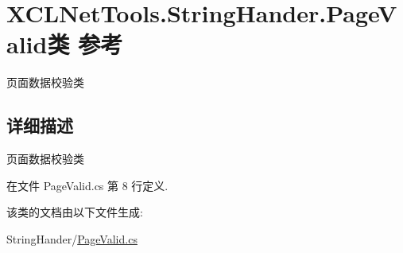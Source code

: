 \hypertarget{class_x_c_l_net_tools_1_1_string_hander_1_1_page_valid}{\section{X\-C\-L\-Net\-Tools.\-String\-Hander.\-Page\-Valid类 参考}
\label{class_x_c_l_net_tools_1_1_string_hander_1_1_page_valid}
}


页面数据校验类  




\subsection{详细描述}
页面数据校验类 



在文件 Page\-Valid.\-cs 第 8 行定义.



该类的文档由以下文件生成\-:\begin{DoxyCompactItemize}
\item 
String\-Hander/\hyperlink{_page_valid_8cs}{Page\-Valid.\-cs}\end{DoxyCompactItemize}
